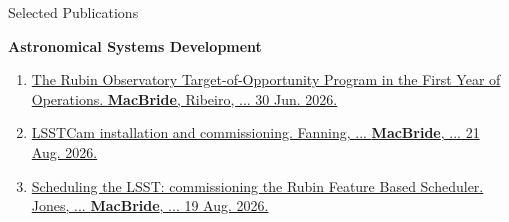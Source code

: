 \begin{rSection}{Selected Publications}
\begin{rSubsection}{\textbf{Astronomical Systems Development}}{}{}{}
\begin{enumerate}
    \item \href{https://arxiv.org/abs/2607.00217}{The Rubin Observatory Target-of-Opportunity Program in the First Year of Operations. \textbf{MacBride}, Ribeiro, ... 30 Jun. 2026.}
    \item \href{https://www.spiedigitallibrary.org/conference-proceedings-of-spie/14147/1414714/LSSTCam-Installation-and-Commissioning-at-the-Vera-C-Rubin-Observatory/10.1117/12.3105731.short}{\ac{LSSTCam} installation and commissioning. Fanning, ... \textbf{MacBride}, ... 21 Aug. 2026.}
    \item \href{https://www.spiedigitallibrary.org/conference-proceedings-of-spie/14151/141510X/Scheduling-the-LSST-commissioning-the-Rubin-feature-based-scheduler/10.1117/12.3104048.short}{Scheduling the LSST: commissioning the Rubin Feature Based Scheduler. Jones, ... \textbf{MacBride}, ... 19 Aug. 2026.}
\end{enumerate}
\end{rSubsection}
\end{rSection}
